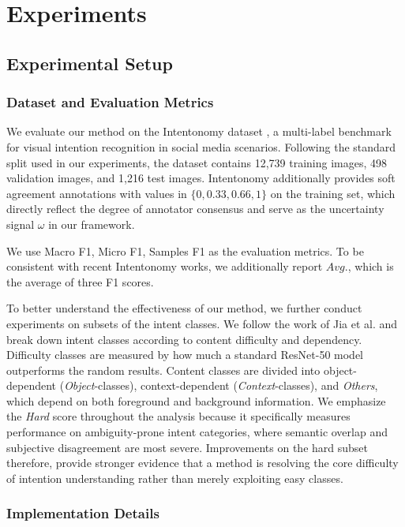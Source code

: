 \section{Experiments}
\label{sec:experiments}

\subsection{Experimental Setup}

\subsubsection{Dataset and Evaluation Metrics}
We evaluate our method on the Intentonomy dataset \cite{jia_intentonomy_2021}, a multi-label benchmark for visual intention recognition in social media scenarios. Following the standard split used in our experiments, the dataset contains 12,739 training images, 498 validation images, and 1,216 test images. Intentonomy additionally provides soft agreement annotations with values in $\{0, 0.33, 0.66, 1\}$ on the training set, which directly reflect the degree of annotator consensus and serve as the uncertainty signal $\omega$ in our framework.

We use Macro F1, Micro F1, Samples F1 as the evaluation metrics. To be consistent with recent Intentonomy works, we additionally report $\textit{Avg.}$, which is the average of three F1 scores. 

To better understand the effectiveness of our method, we further conduct experiments on subsets of the intent classes. We follow the work of Jia et al. \cite{jia_intentonomy_2021} and break down intent classes according to content difficulty and dependency. Difficulty classes are measured by how much a standard ResNet-50 model outperforms the random results. Content classes are divided into object-dependent ({\itshape Object}-classes), context-dependent ({\itshape Context}-classes), and {\itshape Others}, which depend on both foreground and background information. We emphasize the \textit{Hard} score throughout the analysis because it specifically measures performance on ambiguity-prone intent categories, where semantic overlap and subjective disagreement are most severe. Improvements on the hard subset therefore, provide stronger evidence that a method is resolving the core difficulty of intention understanding rather than merely exploiting easy classes.

\subsubsection{Implementation Details}

